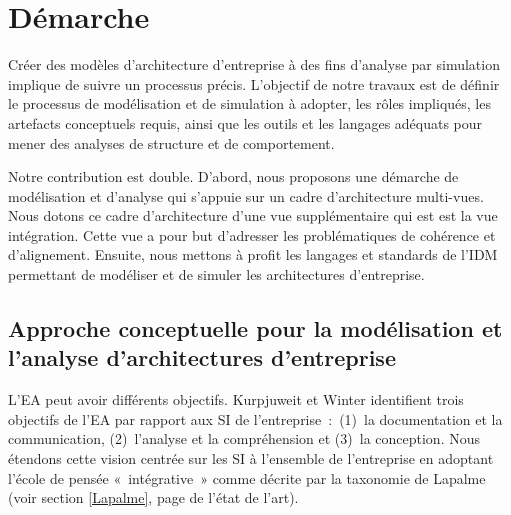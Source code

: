 \chapter{Démarche}
\label{ch:demarche}

Créer des modèles d'architecture d'entreprise à des fins d'analyse par simulation implique de suivre un processus précis. L'objectif de notre travaux est de définir le processus de modélisation et de simulation à adopter, les rôles impliqués, les artefacts conceptuels requis, ainsi que les outils et les langages adéquats pour mener des analyses de structure et de comportement. 

Notre contribution est double. D'abord, nous proposons une démarche de modélisation et d'analyse qui s'appuie sur un cadre d'architecture multi-vues. Nous dotons ce cadre d'architecture d'une vue supplémentaire qui est est la vue intégration. Cette vue a pour but d'adresser les problématiques de cohérence et d'alignement. Ensuite, nous mettons à profit les langages et standards de l'IDM permettant de modéliser et de simuler les architectures d'entreprise. 




\section{Approche conceptuelle pour la modélisation et l'analyse d'architectures d'entreprise}

L'EA peut avoir différents objectifs. Kurpjuweit et Winter \cite{kurpjuweit2007viewpoint} identifient trois objectifs de l'EA par rapport aux SI de l'entreprise~:~(1)~la documentation et la communication, (2)~l'analyse et la compréhension et (3)~la conception. Nous étendons cette vision centrée sur les SI à l'ensemble de l'entreprise en adoptant l'école de pensée «~intégrative~» comme décrite par la taxonomie de Lapalme (voir section \ref{Lapalme}, page \pageref{Lapalme} de l'état de l'art). 


